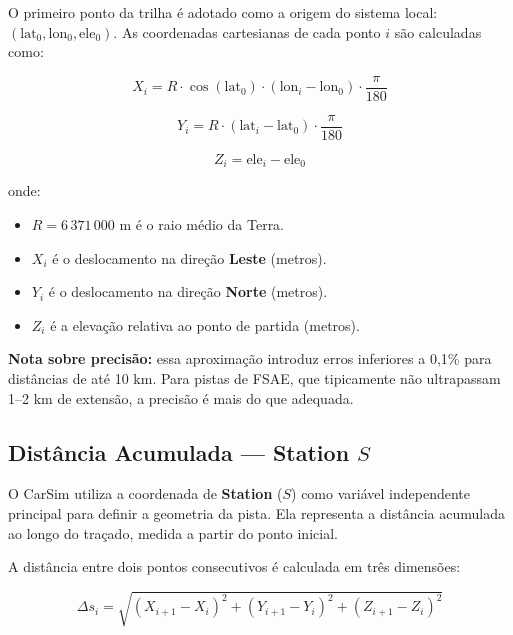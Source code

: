 \documentclass[a4paper,12pt]{article}
\begin{document}
O primeiro ponto da trilha é adotado como a origem do sistema local: $(\text{lat}_0, \text{lon}_0, \text{ele}_0)$. As coordenadas cartesianas de cada ponto $i$ são calculadas como:

\begin{equation}
    X_i = R \cdot \cos(\text{lat}_0) \cdot (\text{lon}_i - \text{lon}_0) \cdot \frac{\pi}{180}
    \label{eq:X}
\end{equation}

\begin{equation}
    Y_i = R \cdot (\text{lat}_i - \text{lat}_0) \cdot \frac{\pi}{180}
    \label{eq:Y}
\end{equation}

\begin{equation}
    Z_i = \text{ele}_i - \text{ele}_0
    \label{eq:Z}
\end{equation}

\noindent onde:
\begin{itemize}
    \item $R = 6\,371\,000$ m é o raio médio da Terra.
    \item $X_i$ é o deslocamento na direção \textbf{Leste} (metros).
    \item $Y_i$ é o deslocamento na direção \textbf{Norte} (metros).
    \item $Z_i$ é a elevação relativa ao ponto de partida (metros).
\end{itemize}

\textbf{Nota sobre precisão:} essa aproximação introduz erros inferiores a 0,1\% para distâncias de até 10 km. Para pistas de FSAE, que tipicamente não ultrapassam 1--2 km de extensão, a precisão é mais do que adequada.

\subsection{Distância Acumulada --- Station $S$}

O CarSim utiliza a coordenada de \textbf{Station} ($S$) como variável independente principal para definir a geometria da pista. Ela representa a distância acumulada ao longo do traçado, medida a partir do ponto inicial.

A distância entre dois pontos consecutivos é calculada em três dimensões:

\begin{equation}
    \Delta s_i = \sqrt{(X_{i+1} - X_i)^2 + (Y_{i+1} - Y_i)^2 + (Z_{i+1} - Z_i)^2}
    \label{eq:ds}
\end{equation}
\end{document}
